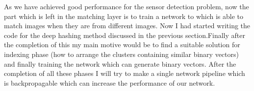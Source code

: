 \documentclass[12pt, a4paper,twoside]{article}
\begin{document}
\label{sec:Tentative Plan}
	As we have achieved good performance for the sensor detection problem, now the part which is left in the matching layer is to train a network to which is able to match images when they are from  different images. Now I had started writing the code for the deep hashing method discussed in the previous section.Finally after the completion of this my main motive would be to find a suitable solution for indexing phase (how to arrange the clusters containing similar binary vectors) and finally training the network which can generate binary vectors. After the completion of all these phases I will try to make a single network pipeline which is backpropagable which can increase the performance of our network.
\end{document}
